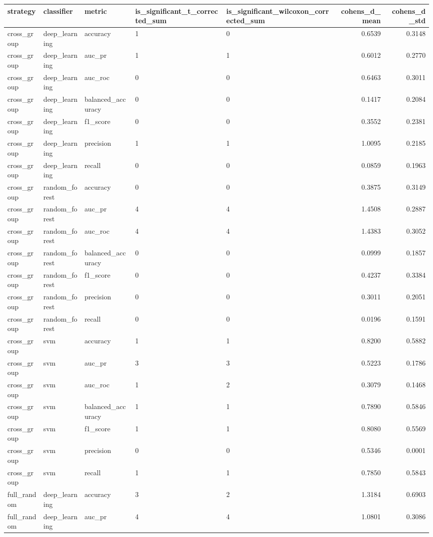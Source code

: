 \begin{tabular}{lllllrr}
\toprule
strategy & classifier & metric & is_significant_t_corrected_sum & is_significant_wilcoxon_corrected_sum & cohens_d_mean & cohens_d_std \\
\midrule
cross_group & deep_learning & accuracy & 1 & 0 & 0.6539 & 0.3148 \\
cross_group & deep_learning & auc_pr & 1 & 1 & 0.6012 & 0.2770 \\
cross_group & deep_learning & auc_roc & 0 & 0 & 0.6463 & 0.3011 \\
cross_group & deep_learning & balanced_accuracy & 0 & 0 & 0.1417 & 0.2084 \\
cross_group & deep_learning & f1_score & 0 & 0 & 0.3552 & 0.2381 \\
cross_group & deep_learning & precision & 1 & 1 & 1.0095 & 0.2185 \\
cross_group & deep_learning & recall & 0 & 0 & 0.0859 & 0.1963 \\
cross_group & random_forest & accuracy & 0 & 0 & 0.3875 & 0.3149 \\
cross_group & random_forest & auc_pr & 4 & 4 & 1.4508 & 0.2887 \\
cross_group & random_forest & auc_roc & 4 & 4 & 1.4383 & 0.3052 \\
cross_group & random_forest & balanced_accuracy & 0 & 0 & 0.0999 & 0.1857 \\
cross_group & random_forest & f1_score & 0 & 0 & 0.4237 & 0.3384 \\
cross_group & random_forest & precision & 0 & 0 & 0.3011 & 0.2051 \\
cross_group & random_forest & recall & 0 & 0 & 0.0196 & 0.1591 \\
cross_group & svm & accuracy & 1 & 1 & 0.8200 & 0.5882 \\
cross_group & svm & auc_pr & 3 & 3 & 0.5223 & 0.1786 \\
cross_group & svm & auc_roc & 1 & 2 & 0.3079 & 0.1468 \\
cross_group & svm & balanced_accuracy & 1 & 1 & 0.7890 & 0.5846 \\
cross_group & svm & f1_score & 1 & 1 & 0.8080 & 0.5569 \\
cross_group & svm & precision & 0 & 0 & 0.5346 & 0.0001 \\
cross_group & svm & recall & 1 & 1 & 0.7850 & 0.5843 \\
full_random & deep_learning & accuracy & 3 & 2 & 1.3184 & 0.6903 \\
full_random & deep_learning & auc_pr & 4 & 4 & 1.0801 & 0.3086 \\

\end{tabular}
